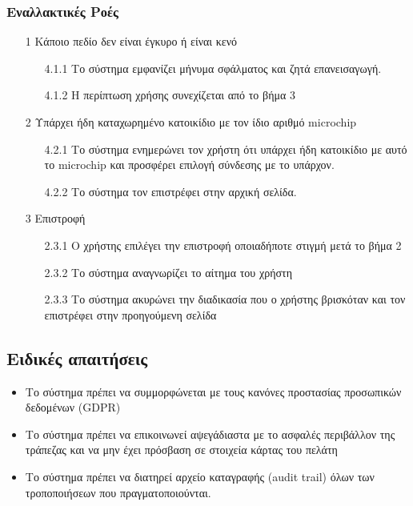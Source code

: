 \documentclass[12pt,a4paper,twoside]{book}
\begin{document}
\subsubsection{Εναλλακτικές Ροές}
\begin{enumerate}
  \item[1 ] Κάποιο πεδίο δεν είναι έγκυρο ή είναι κενό   %
        \begin{enumerate}
          \item[4.1.1 ] Το σύστημα εμφανίζει μήνυμα σφάλματος και ζητά επανεισαγωγή. %
          \item[4.1.2 ] Η περίπτωση χρήσης συνεχίζεται από το βήμα 3 %
        \end{enumerate}
  \item[2 ] Υπάρχει ήδη καταχωρημένο κατοικίδιο με τον ίδιο αριθμό microchip  %
        \begin{enumerate}
          \item[4.2.1 ] Το σύστημα ενημερώνει τον χρήστη ότι υπάρχει ήδη κατοικίδιο με αυτό το microchip  και προσφέρει επιλογή σύνδεσης με το υπάρχον. %
          \item[4.2.2 ] Το σύστημα τον επιστρέφει στην αρχική σελίδα. %
        \end{enumerate}
  \item[3 ] Επιστροφή
        \begin{enumerate}
          \item[2.3.1 ] Ο χρήστης επιλέγει την επιστροφή οποιαδήποτε στιγμή μετά το βήμα 2 %
          \item[2.3.2 ] Το σύστημα αναγνωρίζει το αίτημα του χρήστη %
          \item[2.3.3 ] Το σύστημα ακυρώνει την διαδικασία που ο χρήστης βρισκόταν και τον επιστρέφει στην προηγούμενη σελίδα %
        \end{enumerate}
\end{enumerate}

\subsection{Ειδικές απαιτήσεις} %
\begin{itemize}
  \item Το σύστημα πρέπει να συμμορφώνεται με τους κανόνες προστασίας προσωπικών δεδομένων (GDPR)  %
  \item Το σύστημα πρέπει να επικοινωνεί αψεγάδιαστα με το ασφαλές περιβάλλον της τράπεζας και να μην έχει πρόσβαση σε στοιχεία κάρτας του πελάτη   %
  \item Το σύστημα πρέπει να διατηρεί αρχείο καταγραφής (audit trail) όλων των τροποποιήσεων που πραγματοποιούνται. %
\end{itemize}
\end{document}
